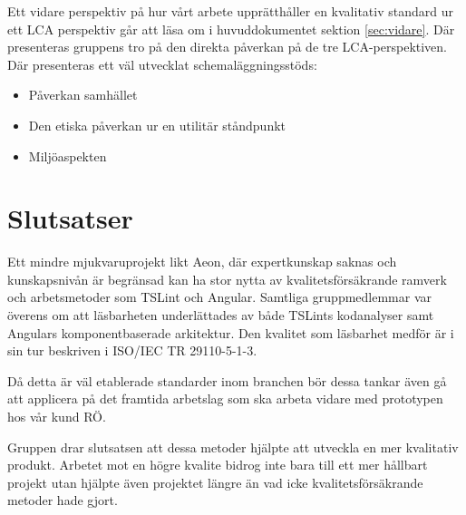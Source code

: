 Ett vidare perspektiv på hur vårt arbete upprätthåller en kvalitativ standard ur ett LCA perspektiv går att läsa om i huvuddokumentet sektion \ref{sec:vidare}. Där presenteras gruppens tro på den direkta påverkan på de tre LCA-perspektiven. Där presenteras ett väl utvecklat schemaläggningsstöds:

\begin{itemize}
	\item Påverkan samhället
	\item Den etiska påverkan ur en utilitär ståndpunkt
	\item Miljöaspekten
\end{itemize}

\section{Slutsatser}

Ett mindre mjukvaruprojekt likt Aeon, där expertkunskap saknas och kunskapsnivån är begränsad kan ha stor nytta av kvalitetsförsäkrande ramverk och arbetsmetoder som TSLint och Angular. 
Samtliga gruppmedlemmar var överens om att läsbarheten underlättades av både TSLints kodanalyser samt Angulars komponentbaserade arkitektur.
Den kvalitet som läsbarhet medför är i sin tur beskriven i ISO/IEC TR 29110-5-1-3.

Då detta är väl etablerade standarder inom branchen bör dessa tankar även gå att applicera på det framtida arbetslag som ska arbeta vidare med prototypen hos vår kund RÖ. 

Gruppen drar slutsatsen att dessa metoder hjälpte att utveckla en mer kvalitativ produkt. Arbetet mot en högre kvalite bidrog inte bara till ett mer hållbart projekt utan hjälpte även projektet längre än vad icke kvalitetsförsäkrande metoder hade gjort.

